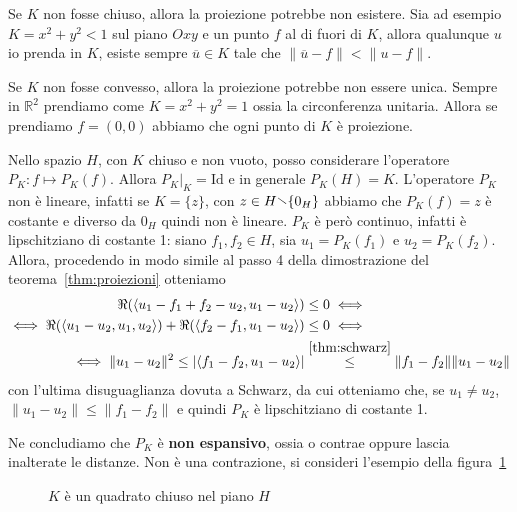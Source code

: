 \begin{remark}
    Se \(K\) non fosse chiuso, allora la proiezione potrebbe
    non esistere. Sia ad esempio \(K = x^2 + y^2 < 1\) sul piano \(Oxy\) e un
    punto \(f\) al di fuori di \(K\), allora qualunque \(u\) io prenda in \(K\),
    esiste sempre \(\overline{u} \in K\) tale che \(\|\overline{u} - f\| < \|u
    -f\|\).

    Se \(K\) non fosse convesso, allora la proiezione potrebbe non essere unica.
    Sempre in \(\mathbb{R}^2\) prendiamo come \(K = x^2 + y^2 = 1\) ossia la
    circonferenza unitaria. Allora se prendiamo \(f = (0, 0)\) abbiamo che ogni
    punto di \(K\) è proiezione.
\end{remark}

Nello spazio \(H\), con \(K\) chiuso e non vuoto, posso considerare l'operatore
\(P_K : f \mapsto P_K{(f)}\). Allora \(P_K|_K = \text{Id}\) e in generale
\(P_K{(H)} = K\). L'operatore \(P_K\) non è lineare, infatti se \(K = \{z\} \),
con \(z \in H \sminus \{0_H\} \) abbiamo che \(P_K{(f)}= z\) è costante e
diverso da \(0_H\) quindi non è lineare. \(P_K\) è però continuo, infatti è
lipschitziano di costante 1: siano \(f_{1}, f_{2} \in H\), sia \(u_{1} =
P_K{(f_{1})}\) e \(u_{2} = P_K{(f_{2})}\). Allora, procedendo in modo simile
al passo 4 della dimostrazione del teorema~\ref{thm:proiezioni} otteniamo
\begin{align*}
    \Re{({\left\langle u_{1} - f_{1} + f_{2} - u_{2}, u_{1} - u_{2}\right\rangle})} &\le 0  \iff \\
    \iff \Re{({\left\langle u_{1} - u_{2}, u_{1}, u_{2}\right\rangle} )} + \Re{({\left\langle f_{2} - f_{1},
u_{1} - u_{2}\right\rangle})} &\le 0 \iff \\
    \iff \|u_{1}-u_{2}\|^2 \le \left| \left<f_{1}-f_{2}, u_{1}-u_{2} \right>
\right| &\overset{\ref{thm:schwarz}}{\le } \|f_{1} -f_{2}\|\|u_{1} - u_{2}\| 
\end{align*}
con l'ultima disuguaglianza dovuta a Schwarz, da cui otteniamo che, se \(u_{1}
\neq u_{2}\), \(\|u_{1} - u_{2}\| \le \|f_{1}
- f_{2}\|\) e quindi \(P_K\) è lipschitziano di costante 1.

Ne concludiamo che \(P_K\) è \textbf{non espansivo}, ossia o contrae oppure
lascia inalterate le distanze. Non è una contrazione, si consideri l'esempio
della figura~\ref{fig:quadrato}

\begin{figure}[ht]
    \centering
    \caption{\(K\) è un quadrato chiuso nel piano \(H\)}\label{fig:quadrato}
\end{figure}

